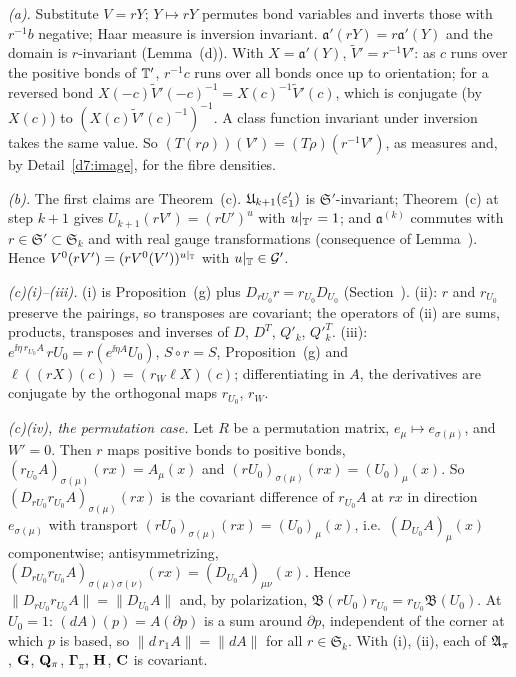 \begin{detail}\label{d7:symmetry}
\begin{step}
\emph{(a).} Substitute $V=rY$; $Y\mapsto rY$ permutes bond variables and inverts those with $r^{-1}b$ negative; Haar measure is inversion invariant. $\mathfrak a'(rY)=r\mathfrak a'(Y)$ and the domain is $r$-invariant (Lemma~(d)). With $X=\mathfrak a'(Y)$, $\tilde V'=r^{-1}V'$: as $c$ runs over the positive bonds of $\mathbb T'$, $r^{-1}c$ runs over all bonds once up to orientation; for a reversed bond $X(-c)\tilde V'(-c)^{-1}=X(c)^{-1}\tilde V'(c)$, which is conjugate (by $X(c)$) to $(X(c)\tilde V'(c)^{-1})^{-1}$. A class function invariant under inversion takes the same value. So $(T(r\rho))(V')=(T\rho)(r^{-1}V')$, as measures and, by Detail~\ref{d7:image}, for the fibre densities.
\end{step}
\begin{step}
\emph{(b).} The first claims are Theorem~(c). $\mathfrak U_{k+1}(\varepsilon'_1)$ is $\mathfrak S'$-invariant; Theorem~(c) at step $k+1$ gives $U_{k+1}(rV')=(rU')^u$ with $u|_{\mathbb T'}=1$; and $\mathfrak a^{(k)}$ commutes with $r\in\mathfrak S'\subset\mathfrak S_k$ and with real gauge transformations (consequence of Lemma~). Hence $V^0(rV')=(rV^0(V'))^{u|_\mathbb T}$ with $u|_\mathbb T\in\mathcal G'$.
\end{step}
\begin{step}
\emph{(c)(i)--(iii).} (i) is Proposition~(g) plus $D_{rU_0}r=r_{U_0}D_{U_0}$ (Section~). (ii): $r$ and $r_{U_0}$ preserve the pairings, so transposes are covariant; the operators of (ii) are sums, products, transposes and inverses of $D$, $D^T$, $Q'_k$, $Q'^T_k$. (iii): $e^{\ii\eta\,r_{U_0}A}\,rU_0=r(e^{\ii\eta A}U_0)$, $S\circ r=S$, Proposition~(g) and $\ell((rX)(c))=(r_W\ell X)(c)$; differentiating in $A$, the derivatives are conjugate by the orthogonal maps $r_{U_0}$, $r_W$.
\end{step}
\begin{step}
\emph{(c)(iv), the permutation case.} Let $R$ be a permutation matrix, $e_\mu\mapsto e_{\sigma(\mu)}$, and $W'=0$. Then $r$ maps positive bonds to positive bonds, $(r_{U_0}A)_{\sigma(\mu)}(rx)=A_\mu(x)$ and $(rU_0)_{\sigma(\mu)}(rx)=(U_0)_\mu(x)$. So $(D_{rU_0}r_{U_0}A)_{\sigma(\mu)}(rx)$ is the covariant difference of $r_{U_0}A$ at $rx$ in direction $e_{\sigma(\mu)}$ with transport $(rU_0)_{\sigma(\mu)}(rx)=(U_0)_\mu(x)$, i.e.\ $(D_{U_0}A)_\mu(x)$ componentwise; antisymmetrizing, $(D_{rU_0}r_{U_0}A)_{\sigma(\mu)\sigma(\nu)}(rx)=(D_{U_0}A)_{\mu\nu}(x)$. Hence $\|D_{rU_0}r_{U_0}A\|=\|D_{U_0}A\|$ and, by polarization, $\mathfrak B(rU_0)r_{U_0}=r_{U_0}\mathfrak B(U_0)$. At $U_0=1$: $(dA)(p)=A(\partial p)$ is a sum around $\partial p$, independent of the corner at which $p$ is based, so $\|d\,r_1A\|=\|dA\|$ for all $r\in\mathfrak S_k$. With (i), (ii), each of $\mathfrak A_\pi$, $\mathbf G$, $\mathbf Q_\pi$, $\boldsymbol\Gamma_\pi$, $\mathbf H$, $\mathbf C$ is covariant.

\end{step}
\end{detail}
